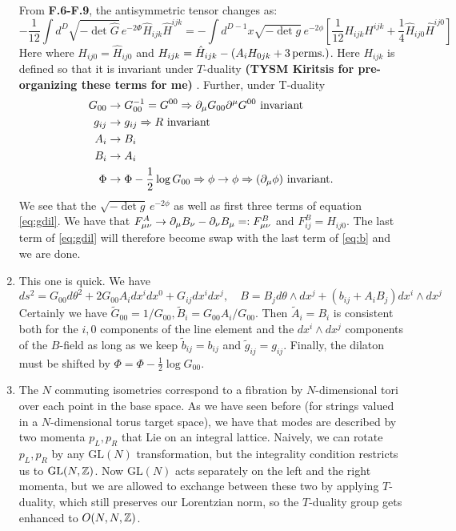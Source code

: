 \documentclass[11pt, class=article, crop=false]{standalone}
\begin{document}
\begin{enumerate}
	From \textbf{F.6-F.9}, the antisymmetric tensor changes as:
	\begin{equation}\label{eq:b}
		-\frac1{12} \int d^D \sqrt{-\det \hat G}\, e^{-2\Phi} \hat H_{ijk} \hat H^{ijk} = - \int d^{D-1} x \sqrt{-\det g} \, e^{-2 \phi} \left[\frac1{12} H_{ijk} H^{ijk} + \frac14 \hat H_{ij0} \hat H^{ij0} \right]
	\end{equation}
	Here where $H_{ij0} = \hat H_{ij0}$ and $H_{ijk} = \hat H_{ijk} - (A_i H_{0jk} + 3 \,\mathrm{perms.})$.  Here $H_{ijk}$ is defined so that it is invariant under $T$-duality \textbf{(TYSM Kiritsis for pre-organizing these terms for me)} . Further, under T-duality
	\begin{equation}\label{eq:Tdual}
		\begin{aligned}
			G_{00} &\to G_{00}^{-1} = G^{00} \Rightarrow \partial_\mu G_{00} \partial^\mu G^{00} \text{ invariant}\\
			g_{ij} &\to g_{ij} \Rightarrow R  \text{ invariant} \\
			A_i &\to B_i\\
			B_i &\to A_i\\
			\Phi &\to \Phi - \frac12 \log G_{00}\Rightarrow \phi \to \phi \Rightarrow (\partial_\mu \phi)  \text{ invariant}.
		\end{aligned}		
	\end{equation}
	We see that the $\sqrt{- \det g} \, e^{-2\phi}$ as well as first three terms of equation \eqref{eq:gdil}. We have that $F_{\mu \nu}^A \to \partial_\mu B_\nu - \partial_\nu B_\mu =: F^B_{\mu \nu}$ and $F^B_{ij} = H_{ij0}$. The last term of \eqref{eq:gdil} will therefore  become  swap with the last term of \eqref{eq:b} and we are done.
	
	\item This one is quick. We have
	\[
		ds^2 = G_{00} d\theta^2 + 2 G_{00} A_{i} dx^i dx^0 + G_{ij} dx^i dx^j, \quad B = B_j d\theta \wedge dx^j + (b_{ij} + A_i B_j) dx^i \wedge dx^j
	\]
	Certainly we have $\tilde G_{00} = 1/G_{00}, \tilde B_i = G_{00} A_i/G_{00}$. Then $\tilde A_i = B_i$ is consistent both for the $i,0$ components of the line element and the $dx^i \wedge dx^j$ components of the $B$-field as long as we keep $\tilde b_{ij} = b_{ij}$ and $\tilde g_{ij} = g_{ij}$. Finally, the dilaton must be shifted by $\Phi = \Phi - \frac12 \log G_{00}$. 
	
	\item The $N$ commuting isometries correspond to a fibration by $N$-dimensional tori over each point in the base space. As we have seen before (for strings valued in a $N$-dimensional torus target space), we have that modes are described by two momenta $p_L, p_R$ that Lie on an integral lattice. Naively, we can rotate $p_L, p_R$ by any $\mathrm{GL}(N)$ transformation, but the integrality condition restricts us to $\mathrm{GL}(N, \mathbb{Z})$. Now $\mathrm{GL}(N)$ acts separately on the left and the right momenta, but we are allowed to exchange between these two by applying $T$-duality, which still preserves our Lorentzian norm, so the $T$-duality group gets enhanced to $O(N, N, \mathbb{Z})$.
	

\end{enumerate}
\end{document}
